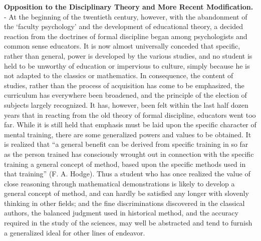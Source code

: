 \documentclass[]{book}
\begin{document}
\textbf{Opposition to the Disciplinary Theory and More Recent Modification.} - At the beginning of the twentieth century, however, with the abandonment of the `faculty psychology' and the development of educational theory, a decided reaction from the doctrines of formal discipline began among psychologists and common sense educators. It is now almost universally conceded that specific, rather than general, power is developed by the various studies, and no student is held to be unworthy of education or impervious to culture, simply because he is not adapted to the classics or mathematics. In consequence, the content of studies, rather than the process of acquisition has come to be emphasized, the curriculum has everywhere been broadened, and the principle of the election of subjects largely recognized. It has, however, been felt within the last half dozen years that in reacting from the old theory of formal discipline, educators went too far. While it is still held that emphasis must be laid upon the specific character of mental training, there are some generalized powers and values to be obtained. It is realized that ``a general benefit can be derived from specific training in so far as the person trained has consciously wrought out in connection with the specific training a general concept of method, based upon the specific methods used in that training'' (F. A. Hodge). Thus a student who has once realized the value of close reasoning through mathematical demonstrations is likely to develop a general concept of method, and can hardly be satisfied any longer with slovenly thinking in other fields; and the fine discriminations discovered in the classical authors, the balanced judgment used in historical method, and the accuracy required in the study of the sciences, may well be abstracted and tend to furnish a generalized ideal for other lines of endeavor.
\end{document}

